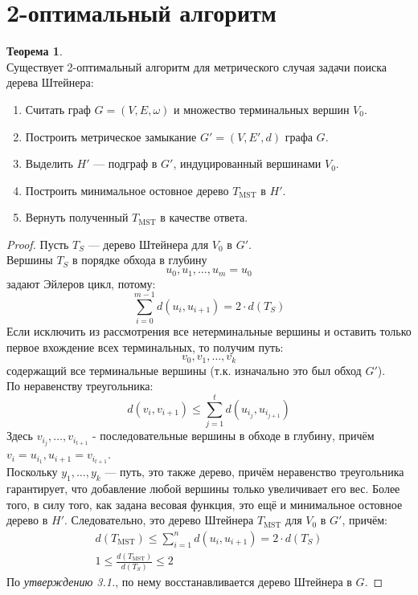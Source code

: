 \documentclass[11pt,a4paper]{report}
\def\le{\leqslant}
\theoremstyle{definition}
\theoremstyle{definition}
\newtheorem{theorem}{Теорема}[section]
\theoremstyle{definition}
\begin{document}
	\section{2-оптимальный алгоритм}
	\begin{theorem}$  $\\
		Существует 2-оптимальный алгоритм для метрического случая задачи поиска дерева Штейнера:
		\begin{enumerate}
			\item Считать граф $G = (V, E, \omega)$ и множество терминальных вершин $V_0$.
			\item Построить метрическое замыкание $G' = (V, E', d)$ графа $G$.
			\item Выделить $H'$ — подграф в $G'$, индуцированный вершинами $V_0$. 
			\item Построить минимальное остовное дерево $T_{\mathrm{MST}}$ в $H'$.
			\item Вернуть полученный $T_{\mathrm{MST}} $ в качестве ответа.
		\end{enumerate}
	\end{theorem}
	\begin{proof}
		Пусть $T_{S}$ — дерево Штейнера для $V_0$ в $G'$.\\
		Вершины $T_{S}$ в порядке обхода в глубину
		$$
			u_0, u_1, \ldots, u_m = u_0
		$$ 
		задают Эйлеров цикл, потому:
		$$ 
			\sum_{i=0}^{m-1} d(u_i, u_{i+1}) = 2 \cdot d(T_{S})
		$$
		Если исключить из рассмотрения все нетерминальные вершины и оставить только первое вхождение всех терминальных, то получим путь:
		$$
			v_0, v_1, \ldots, v_k
		$$
		содержащий все терминальные вершины (т.к. изначально это был обход $G'$).\\ 
		По неравенству треугольника:
		$$
			d(v_i, v_{i+1}) \le \sum_{j=1}^{t} d(u_{i_j}, u_{i_{j+1}})
		$$
		Здесь $v_{i_{j}}, \ldots, v_{i_{t+1}}$ - последовательные вершины в обходе в глубину, причём $v_i = u_{i_{1}}, u_{i+1} = v_{i_{t+1}}$.\\
		Поскольку $y_1, \ldots, y_k$ — путь, это также дерево, причём неравенство треугольника гарантирует, что добавление любой вершины только увеличивает его вес. Более того, в силу того, как задана весовая функция, это ещё и минимальное остовное дерево в $H'$. Следовательно, это дерево Штейнера $T_{\mathrm{MST}}$ для $V_0$ в $G'$, причём:
		\begin{gather*}
			d(T_{\mathrm{MST}}) \le \sum_{i=1}^{n} d(u_i, u_{i+1}) = 2 \cdot d(T_{S})\\
			1 \le \frac{d(T_{\mathrm{MST}})}{d(T_{S})} \le 2
		\end{gather*}
		По \textit{утверждению 3.1.}, по нему восстанавливается дерево Штейнера в $G$.
	\end{proof}
\end{document}
